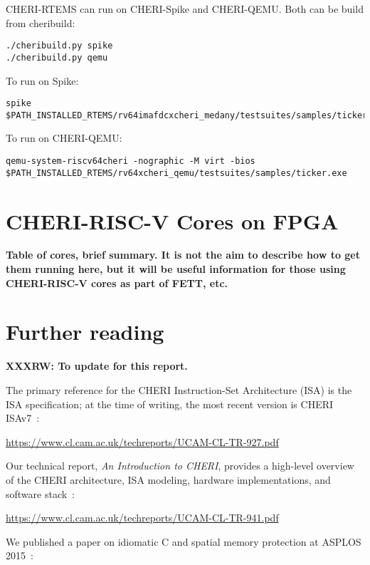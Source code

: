 \documentclass[12pt,twoside,openright,a4paper]{article}
\begin{document}
CHERI-RTEMS can run on CHERI-Spike and CHERI-QEMU. Both can be build from cheribuild:

\begin{lstlisting}
./cheribuild.py spike
./cheribuild.py qemu
\end{lstlisting}

To run on Spike:

\begin{lstlisting}[breaklines]
spike $PATH_INSTALLED_RTEMS/rv64imafdcxcheri_medany/testsuites/samples/ticker.exe
\end{lstlisting}

To run on CHERI-QEMU:

\begin{lstlisting}[breaklines]
qemu-system-riscv64cheri -nographic -M virt -bios $PATH_INSTALLED_RTEMS/rv64xcheri_qemu/testsuites/samples/ticker.exe
\end{lstlisting}

\section{CHERI-RISC-V Cores on FPGA}

\textbf{Table of cores, brief summary.  It is not the aim to describe how to
  get them running here, but it will be useful information for those using
  CHERI-RISC-V cores as part of FETT, etc.}

\section{Further reading}
\label{sec:further_reading}

\textbf{XXXRW: To update for this report.}

The primary reference for the CHERI Instruction-Set Architecture (ISA) is the
ISA specification; at the time of writing, the most recent version is CHERI
ISAv7~\cite{UCAM-CL-TR-927}:

\smallskip
\noindent
\url{https://www.cl.cam.ac.uk/techreports/UCAM-CL-TR-927.pdf}
\smallskip

\noindent
Our technical report, \textit{An Introduction to CHERI}, provides a high-level
overview of the CHERI architecture, ISA modeling, hardware implementations,
and software stack~\cite{UCAM-CL-TR-941}:

\smallskip
\noindent
\url{https://www.cl.cam.ac.uk/techreports/UCAM-CL-TR-941.pdf}
\smallskip

\noindent
We published a paper on idiomatic C and spatial memory protection at ASPLOS
2015~\cite{ChisnallCPDP11}:
\end{document}
